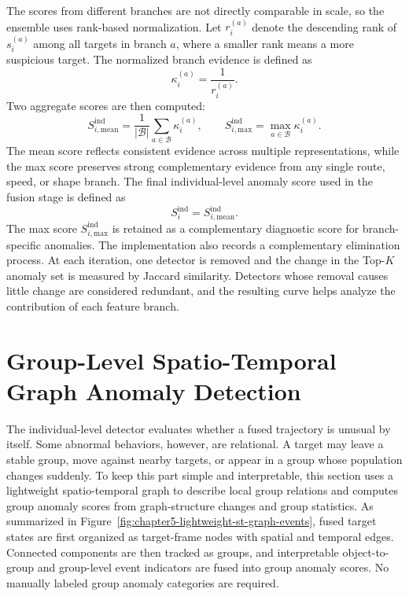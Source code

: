 The scores from different branches are not directly comparable in scale, so the ensemble uses rank-based normalization. Let \(r_i^{(a)}\) denote the descending rank of \(s_i^{(a)}\) among all targets in branch \(a\), where a smaller rank means a more suspicious target. The normalized branch evidence is defined as
\begin{equation}
  \kappa_i^{(a)}=\frac{1}{r_i^{(a)}}.
\end{equation}
Two aggregate scores are then computed:
\begin{equation}
  S_{i,\mathrm{mean}}^{\mathrm{ind}}=
  \frac{1}{|\mathcal{B}|}\sum_{a\in\mathcal{B}}\kappa_i^{(a)},\qquad
  S_{i,\mathrm{max}}^{\mathrm{ind}}=
  \max_{a\in\mathcal{B}}\kappa_i^{(a)}.
\end{equation}
The mean score reflects consistent evidence across multiple representations, while the max score preserves strong complementary evidence from any single route, speed, or shape branch. The final individual-level anomaly score used in the fusion stage is defined as
\begin{equation}
  S_i^{\mathrm{ind}}=S_{i,\mathrm{mean}}^{\mathrm{ind}}.
\end{equation}
The max score \(S_{i,\mathrm{max}}^{\mathrm{ind}}\) is retained as a complementary diagnostic score for branch-specific anomalies. The implementation also records a complementary elimination process. At each iteration, one detector is removed and the change in the Top-\(K\) anomaly set is measured by Jaccard similarity. Detectors whose removal causes little change are considered redundant, and the resulting curve helps analyze the contribution of each feature branch.

\section{Group-Level Spatio-Temporal Graph Anomaly Detection}

The individual-level detector evaluates whether a fused trajectory is unusual by itself. Some abnormal behaviors, however, are relational. A target may leave a stable group, move against nearby targets, or appear in a group whose population changes suddenly. To keep this part simple and interpretable, this section uses a lightweight spatio-temporal graph to describe local group relations and computes group anomaly scores from graph-structure changes and group statistics. As summarized in Figure~\ref{fig:chapter5-lightweight-st-graph-events}, fused target states are first organized as target-frame nodes with spatial and temporal edges. Connected components are then tracked as groups, and interpretable object-to-group and group-level event indicators are fused into group anomaly scores. No manually labeled group anomaly categories are required.

